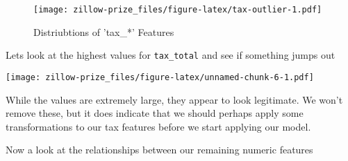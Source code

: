 \documentclass[]{book}
\newenvironment{Shaded}{\begin{snugshade}}{\end{snugshade}}
\newcommand{\KeywordTok}[1]{\textcolor[rgb]{0.13,0.29,0.53}{\textbf{#1}}}
\newcommand{\DataTypeTok}[1]{\textcolor[rgb]{0.13,0.29,0.53}{#1}}
\newcommand{\DecValTok}[1]{\textcolor[rgb]{0.00,0.00,0.81}{#1}}
\newcommand{\StringTok}[1]{\textcolor[rgb]{0.31,0.60,0.02}{#1}}
\newcommand{\OtherTok}[1]{\textcolor[rgb]{0.56,0.35,0.01}{#1}}
\newcommand{\OperatorTok}[1]{\textcolor[rgb]{0.81,0.36,0.00}{\textbf{#1}}}
\newcommand{\NormalTok}[1]{#1}
\theoremstyle{definition}
\theoremstyle{definition}
\theoremstyle{definition}
\theoremstyle{remark}
\begin{document}
\begin{figure}
\centering
\texttt{[image: zillow-prize\_files/figure-latex/tax-outlier-1.pdf]}
\caption{\label{fig:tax-outlier}Distriubtions of 'tax\_*' Features}
\end{figure}

Lets look at the highest values for \texttt{tax\_total} and see if
something jumps out

\begin{Shaded}
\end{Shaded}

\texttt{[image: zillow-prize\_files/figure-latex/unnamed-chunk-6-1.pdf]}

While the values are extremely large, they appear to look legitimate. We
won't remove these, but it does indicate that we should perhaps apply
some transformations to our tax features before we start applying our
model.

Now a look at the relationships between our remaining numeric features

\begin{Shaded}
\end{Shaded}
\end{document}
